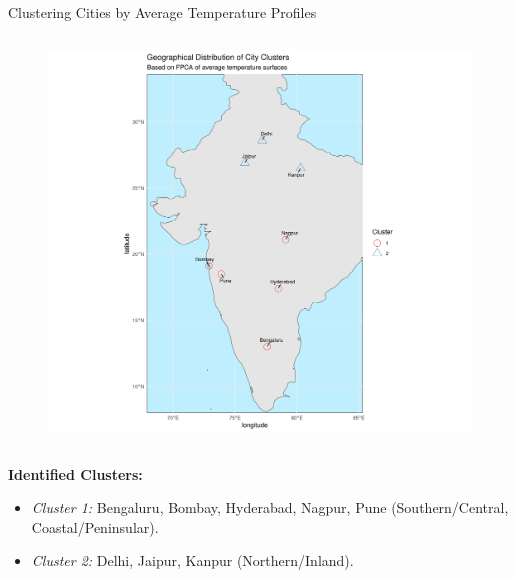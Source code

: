 \documentclass[svgnames, 12pt]{beamer}
\begin{document}
\begin{frame}{Clustering Cities by Average Temperature Profiles}
\begin{columns}[T]
\begin{column}{0.5\textwidth}
\begin{figure}
        \includegraphics[width=\linewidth]{../data/output/figures/cluster_map_india.png}
      \end{figure}
    \end{column}
  \end{columns}
  \textbf{Identified Clusters:}
  \begin{itemize}
    \item \textit{Cluster 1:} Bengaluru, Bombay, Hyderabad, Nagpur, Pune (Southern/Central, Coastal/Peninsular).
    \item \textit{Cluster 2:} Delhi, Jaipur, Kanpur (Northern/Inland).
  \end{itemize}
\end{frame}
\end{document}
